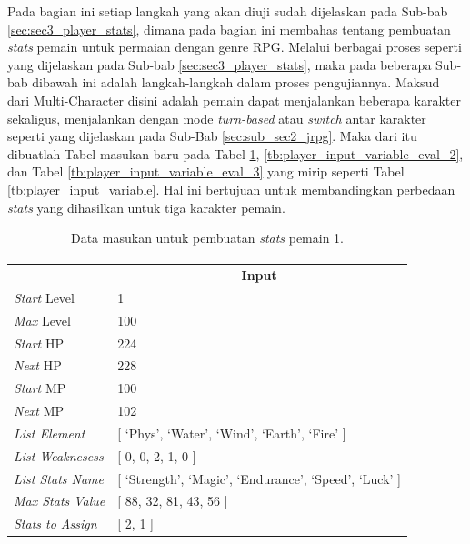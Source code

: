 Pada bagian ini setiap langkah yang akan diuji sudah dijelaskan pada Sub-bab \ref{sec:sec3_player_stats}, dimana pada bagian ini membahas tentang pembuatan \textit{stats} pemain untuk permaian dengan genre RPG. Melalui berbagai proses seperti yang dijelaskan pada Sub-bab \ref{sec:sec3_player_stats}, maka pada beberapa Sub-bab dibawah ini adalah langkah-langkah dalam proses pengujiannya. Maksud dari Multi-Character disini adalah pemain dapat menjalankan beberapa karakter sekaligus, menjalankan dengan mode \textit{turn-based} atau \textit{switch} antar karakter seperti yang dijelaskan pada Sub-Bab \ref{sec:sub_sec2_jrpg}. Maka dari itu dibuatlah Tabel masukan baru pada Tabel \ref{tb:player_input_variable_eval_1}, \ref{tb:player_input_variable_eval_2}, dan Tabel \ref{tb:player_input_variable_eval_3} yang mirip seperti Tabel \ref{tb:player_input_variable}. Hal ini bertujuan untuk membandingkan perbedaan \textit{stats} yang dihasilkan untuk tiga karakter pemain.
\vspace{-1ex}

\begin{longtable}{|l|l|}
	\caption{Data masukan untuk pembuatan \textit{stats} pemain 1.}
	\vspace{1ex}
	\label{tb:player_input_variable_eval_1}\\
	\hline
	\rowcolor[HTML]{9B9B9B} 
	\multicolumn{1}{|c|}{\cellcolor[HTML]{9B9B9B}\textbf{Variabel}} & \multicolumn{1}{c|}{\cellcolor[HTML]{9B9B9B}\textbf{Input}} \\ \hline
	\textit{Start} Level & 1 \\ \hline
	\textit{Max} Level & 100 \\ \hline
	\textit{Start} HP & 224 \\ \hline
	\textit{Next} HP & 228 \\ \hline
	\textit{Start} MP & 100 \\ \hline
	\textit{Next} MP & 102 \\ \hline
	\textit{List Element} & {[} `Phys', `Water', `Wind', `Earth', `Fire' {]} \\ \hline
	\textit{List Weaknesess} & {[} 0, 0, 2, 1, 0 {]} \\ \hline
	\textit{List Stats Name} & {[} `Strength', `Magic', `Endurance', `Speed', `Luck' {]} \\ \hline
	\textit{Max Stats Value} & {[} 88, 32, 81, 43, 56 {]} \\ \hline
	\textit{Stats to Assign} & {[} 2, 1 {]} \\ \hline
\end{longtable}
\vspace{-1ex}


